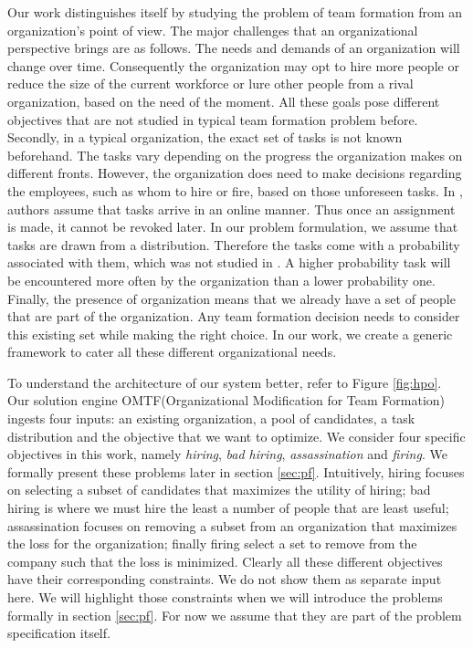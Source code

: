 Our work distinguishes itself by studying the problem of team formation from an organization's point of view. The major challenges that an organizational perspective brings are as follows. The needs and demands of an organization will change over time. Consequently the organization may opt to hire more people or reduce the size of the current workforce or lure other people from a rival organization, based on the need of the moment. All these goals pose different objectives that are not studied in typical team formation problem before. Secondly, in a typical organization, the exact set of tasks is not known beforehand. The tasks vary depending on the progress the organization makes on different fronts. However, the organization does need to make decisions regarding the employees, such as whom to hire or fire, based on those unforeseen tasks. In \cite{anagnostopoulos2012online}, authors assume that tasks arrive in an online manner. Thus once an assignment is made, it cannot be revoked later. In our problem formulation, we assume that tasks are drawn from a distribution. Therefore the tasks come with a probability associated with them, which was not studied in \cite{anagnostopoulos2012online}. A higher probability task will be encountered more often by the organization than a lower probability one. Finally, the presence of organization means that we already have a set of people that are part of the organization. Any team formation decision needs to consider this existing set while making the right choice. In our work, we create a generic framework to cater all these different organizational needs.

To understand the architecture of our system better, refer to Figure \ref{fig:hpo}. Our solution engine OMTF(Organizational Modification for Team Formation) ingests four inputs: an existing organization, a pool of candidates, a task distribution and the objective that we want to optimize. We consider four specific objectives in this work, namely \textit{hiring}, \textit{bad hiring}, \textit{assassination} and \textit{firing}. We formally present these problems later in section \ref{sec:pf}. Intuitively, hiring focuses on selecting a subset of candidates that maximizes the utility of hiring; bad hiring is where we must hire the least a number of people that are least useful; assassination focuses on removing a subset from an organization that maximizes the loss for the organization; finally firing select a set to remove from the company such that the loss is minimized. Clearly all these different objectives have their corresponding constraints. We do not show them as separate input here. We will highlight those constraints when we will introduce the problems formally in section \ref{sec:pf}.  For now we assume that they are part of the problem specification itself.

